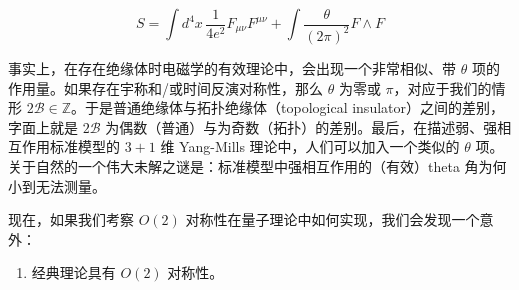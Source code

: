 \begin{equation}
  S=\int d^{4}x\,\frac{1}{4e^{2}}F_{\mu\nu}F^{\mu\nu}+\int\frac{\theta}{(2\pi)^{2}}F\wedge F
  \tag{2.18}
  \label{eq:2.18}
\end{equation}

事实上，在存在绝缘体时电磁学的有效理论中，会出现一个非常相似、带 $\theta$ 项的作用量。如果存在宇称和/或时间反演对称性，那么 $\theta$ 为零或 $\pi$，对应于我们的情形 $2\mathcal{B}\in\mathbb{Z}$。于是普通绝缘体与拓扑绝缘体（topological insulator）之间的差别，字面上就是 $2\mathcal{B}$ 为偶数（普通）与为奇数（拓扑）的差别。最后，在描述弱、强相互作用标准模型的 $3+1$ 维 Yang-Mills 理论中，人们可以加入一个类似的 $\theta$ 项。关于自然的一个伟大未解之谜是：标准模型中强相互作用的（有效）theta 角为何小到无法测量。

现在，如果我们考察 $O(2)$ 对称性在量子理论中如何实现，我们会发现一个意外：

\begin{enumerate}
  \item 经典理论具有 $O(2)$ 对称性。
\end{enumerate}
